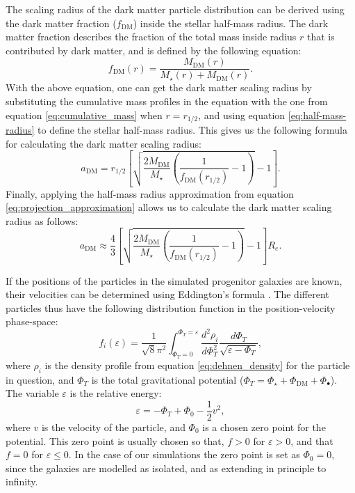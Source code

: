 \documentclass[english, oneside]{HYgradu}
\begin{document}
The scaling radius of the dark matter particle distribution can be derived using the dark matter fraction ($f_{\mathrm{DM}}$) inside the stellar half-mass radius. The dark matter fraction describes the fraction of the total mass inside radius $r$ that is contributed by dark matter, and is defined by the following equation:
\begin{equation}
f_\mathrm{DM}(r) = \frac{M_\mathrm{DM}(r)}{M_\star(r) + M_\mathrm{DM}(r)}. \label{eq:dm_fraction}
\end{equation}
With the above equation, one can get the dark matter scaling radius by substituting the cumulative mass profiles in the equation with the one from equation \ref{eq:cumulative_mass} when $r=r_{1/2}$, and using equation \ref{eq:half-mass-radius} to define the stellar half-mass radius. This gives us the following formula for calculating the dark matter scaling radius:
\begin{equation}
a_\mathrm{DM} =  r_\mathrm{1/2} \left[ \sqrt{\frac{2M_\mathrm{DM}}{M_\star} \left( \frac{1}{f_\mathrm{DM}(r_{1/2})} - 1 \right)} -1 \right].
\end{equation}
Finally, applying the half-mass radius approximation from equation \ref{eq:projection_approximation} allows us to calculate the dark matter scaling radius as follows:
\begin{equation}
a_\mathrm{DM} \approx \frac{4}{3} \left[ \sqrt{\frac{2M_\mathrm{DM}}{M_\star} \left( \frac{1}{f_\mathrm{DM}(r_{1/2})} - 1 \right)} -1 \right] R_e.
\end{equation}

If the positions of the particles in the simulated progenitor galaxies are known, their velocities can be determined using Eddington's formula \citep{BinneyTremaine}. The different particles thus have the following distribution function in the position-velocity phase-space:
\begin{equation}
f_i(\varepsilon) = \frac{1}{\sqrt{8}\pi^2} \int^{\Phi_T = \varepsilon}_{\Phi_T = 0} \frac{d^2\rho_i}{d\Phi^2_T}
\frac{d\Phi_T}{\sqrt{\varepsilon - \Phi_T}}, \label{eq:eddington_form}
\end{equation}
where $\rho_i$ is the density profile from equation \ref{eq:dehnen_density} for the particle in question, and $\Phi_T$ is the total gravitational potential ($\Phi_T = \Phi_\star + \Phi_\mathrm{DM} + \Phi_\bullet$). The variable $\varepsilon$ is the relative energy:
\begin{equation}
\varepsilon = -\Phi_T + \Phi_0 - \frac{1}{2} v^2,
\end{equation}
where $v$ is the velocity of the particle, and $\Phi_0$ is a chosen zero point for the potential. This zero point is usually chosen so that, $f > 0$ for $\varepsilon > 0$, and that $f = 0$ for $\varepsilon \leq 0$. In the case of our simulations the zero point is set as $\Phi_0 = 0$, since the galaxies are modelled as isolated, and as extending in principle to infinity.
\end{document}
